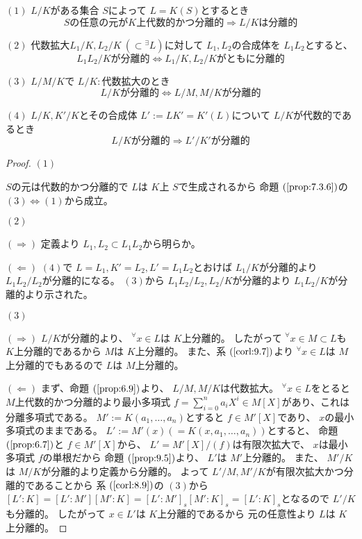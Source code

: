 \documentclass[../master_galois_theory]{subfiles}
\begin{document}
\begin{prop} \label{prop:9.9}
  $(1)$
  $L/K$がある集合 $S$によって $L = K(S)$とするとき
  \[
    Sの任意の元が K上代数的かつ分離的 \Rightarrow
    L/K は分離的
  \]

  $(2)$
  代数拡大$L_1/K , L_2/K \  (\subset {}^\exists L)$に対して
  $L_1 , L_2$の合成体を $L_1 L_2$とすると、
  \[
  L_1 L_2 / Kが分離的 \Leftrightarrow L_1/K , L_2/Kがともに分離的
  \]

  $(3)$
  $L/M/K$で $L/K:$代数拡大のとき
  \[
  L/Kが分離的 \Leftrightarrow L/M , M/Kが分離的
  \]

  $(4)$
  $L/K , K'/K$とその合成体 $L' := L K' = K'(L)$について
  $L/K$が代数的であるとき
  \[
  L/Kが分離的 \Rightarrow L'/K'が分離的
  \]
\end{prop}

\begin{proof}
  $(1)$

  $S$の元は代数的かつ分離的で $L$は $K$上 $S$で生成されるから
  命題 $(\mathrm{\ref{prop:7.3.6}})$の $(3) \Leftrightarrow (1)$から成立。

  $(2)$

  $(\Rightarrow)$
   定義より $L_1 , L_2 \subset L_1 L_2$から明らか。

  $(\Leftarrow)$
  $(4)$で $L = L_1 , K' = L_2 , L' = L_1 L_2$とおけば
  $L_1/K$が分離的より $L_1 L_2 /L_2$が分離的になる。
  $(3)$から $L_1 L_2 /L_2 , L_2/K$が分離的より
  $L_1 L_2 / K$が分離的より示された。

  $(3)$

  $(\Rightarrow)$
  $L/K$が分離的より、 ${}^\forall x \in L$は $K$上分離的。
  したがって ${}^\forall x \in M \subset L$も $K$上分離的であるから
  $M$は $K$上分離的。
  また、系 $(\mathrm{\ref{corl:9.7}})$より
  ${}^\forall x \in L$は $M$上分離的でもあるので $L$は $M$上分離的。

  $(\Leftarrow)$
  まず、命題 $(\mathrm{\ref{prop:6.9}})$より、 $L/M , M/K$は代数拡大。
  ${}^\forall x \in L$をとると $M$上代数的かつ分離的より最小多項式 $f = \sum_{i=0}^n a_i X^i \in M[X]$があり、これは分離多項式である。
  $M' := K(a_1 , \dots , a_n)$とすると $f \in M'[X]$であり、 $x$の最小多項式のままである。
  $L' := M'(x) (= K(x , a_1 , \dots , a_n))$とすると、
  命題 $(\mathrm{\ref{prop:6.7}})$と $f \in M'[X]$から、
  $L' = M'[X]/(f)$は有限次拡大で、 $x$は最小多項式 $f$の単根だから
  命題 $(\mathrm{\ref{prop:9.5}})$より、 $L'$は $M'$上分離的。
  また、 $M'/K$は $M/K$が分離的より定義から分離的。
  よって $L'/M , M'/K$が有限次拡大かつ分離的であることから
  系 $(\mathrm{\ref{corl:8.9}})$の $(3)$から
  $[L':K] = [L':M'][M':K] = [L':M']_s [M':K]_s = [L':K]_s$となるので
  $L'/K$も分離的。
  したがって $x \in L'$は $K$上分離的であるから
  元の任意性より $L$は $K$上分離的。


\end{proof}
\end{document}
